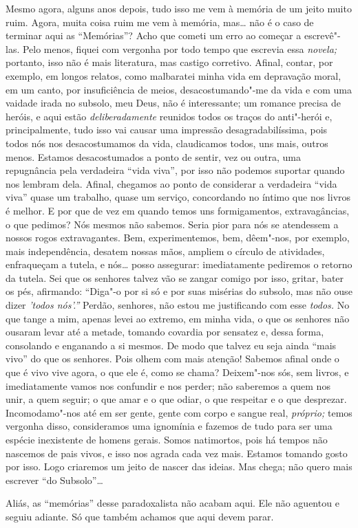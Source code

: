 Mesmo agora, alguns anos depois, tudo isso me vem à memória de um jeito
muito ruim. Agora, muita coisa ruim me vem à memória, mas\ldots{} não é o
caso de terminar aqui as ``Memórias''? Acho que cometi um erro ao
começar a escrevê"-las. Pelo menos, fiquei com vergonha por todo tempo
que escrevia essa \emph{novela;} portanto, isso não é mais literatura,
mas castigo corretivo. Afinal, contar, por exemplo, em longos relatos,
como malbaratei minha vida em depravação moral, em um canto, por
insuficiência de meios, desacostumando"-me da vida e com uma vaidade
irada no subsolo, meu Deus, não é interessante; um romance precisa de
heróis, e aqui estão \emph{deliberadamente} reunidos todos os traços do
anti"-herói e, principalmente, tudo isso vai causar uma impressão
desagradabilíssima, pois todos nós nos desacostumamos da vida,
claudicamos todos, uns mais, outros menos. Estamos desacostumados a
ponto de sentir, vez ou outra, uma repugnância pela verdadeira ``vida
viva'', por isso não podemos suportar quando nos lembram dela. Afinal,
chegamos ao ponto de considerar a verdadeira ``vida viva'' quase um
trabalho, quase um serviço, concordando no íntimo que nos livros é
melhor. E por que de vez em quando temos uns formigamentos,
extravagâncias, o que pedimos? Nós mesmos não sabemos. Seria pior para
nós se atendessem a nossos rogos extravagantes. Bem, experimentemos,
bem, dêem"-nos, por exemplo, mais independência, desatem nossas mãos,
ampliem o círculo de atividades, enfraqueçam a tutela, e nós\ldots{} posso
assegurar: imediatamente pediremos o retorno da tutela. Sei que os
senhores talvez vão se zangar comigo por isso, gritar, bater os pés,
afirmando: ``Diga"-o por si só e por suas misérias do subsolo, mas não
ouse dizer \emph{'todos nós'.''} Perdão, senhores, não estou me
justificando com esse \emph{todos.} No que tange a mim, apenas levei ao
extremo, em minha vida, o que os senhores não ousaram levar até a
metade, tomando covardia por sensatez e, dessa forma, consolando e
enganando a si mesmos. De modo que talvez eu seja ainda ``mais vivo'' do
que os senhores. Pois olhem com mais atenção! Sabemos afinal onde o que
é vivo vive agora, o que ele é, como se chama? Deixem"-nos sós, sem
livros, e imediatamente vamos nos confundir e nos perder; não saberemos
a quem nos unir, a quem seguir; o que amar e o que odiar, o que
respeitar e o que desprezar. Incomodamo"-nos até em ser gente, gente com
corpo e sangue real, \emph{próprio;} temos vergonha disso, consideramos
uma ignomínia e fazemos de tudo para ser uma espécie inexistente de
homens gerais. Somos natimortos, pois há tempos não nascemos de pais
vivos, e isso nos agrada cada vez mais. Estamos tomando gosto por isso.
Logo criaremos um jeito de nascer das ideias. Mas chega; não quero mais
escrever ``do Subsolo''\ldots{}

Aliás, as ``memórias'' desse paradoxalista não acabam aqui. Ele não
aguentou e seguiu adiante. Só que também achamos que aqui devem parar.
